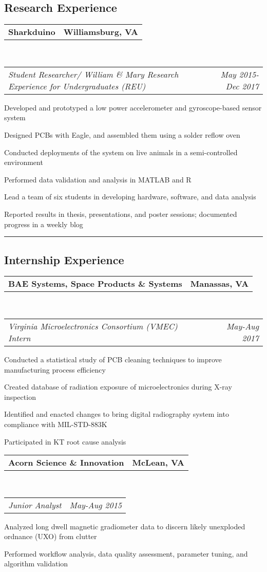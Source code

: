 \documentclass[10pt,letterpaper]{article}
\makeatletter
\newcommand{\headerrow}[2]
{\begin{tabular*}{\linewidth}{l@{\extracolsep{\fill}}r}
	#1 &
	#2 \\
\end{tabular*}}
\makeatother
\begin{document}
\subsection*{Research Experience}

	\headerrow
		{\textbf{Sharkduino}}
		{\textbf{Williamsburg, VA}}
	\\
	\headerrow
		{\emph{Student Researcher/ William \& Mary Research Experience for Undergraduates (REU)}}
		{\emph{May 2015-Dec 2017}}
	\begin{itemize*}
	\item Developed and prototyped a low power accelerometer and gyroscope-based sensor system
	\item Designed PCBs with Eagle, and assembled them using a solder reflow oven
	\item Conducted deployments of the system on live animals in a semi-controlled environment
	\item Performed data validation and analysis in MATLAB and R
	\item Lead a team of six students in developing hardware, software, and data analysis
	\item Reported results in thesis, presentations, and poster sessions; documented progress in a weekly blog
	\end{itemize*}
	
\hrule
\vspace{-0.4em}
\subsection*{Internship Experience}
\headerrow
		{\textbf{BAE Systems, Space Products \& Systems}}
		{\textbf{Manassas, VA}}
	\\
	\headerrow
		{\emph{Virginia Microelectronics Consortium (VMEC) Intern}}
		{\emph{May-Aug 2017}}
\begin{itemize*}
		\item Conducted a statistical study of PCB cleaning techniques to improve manufacturing process efficiency
		\item Created database of radiation exposure of microelectronics during X-ray inspection
		\item Identified and enacted changes to bring digital radiography system into compliance with MIL-STD-883K
		\item Participated in KT root cause analysis
	\end{itemize*}
	\headerrow
		{\textbf{Acorn Science \& Innovation}}
		{\textbf{McLean, VA}}
	\\
	\headerrow
		{\emph{Junior Analyst}}
		{\emph{May-Aug 2015}}
	\begin{itemize*}
		\item Analyzed long dwell magnetic gradiometer data to
			discern likely unexploded ordnance (UXO) from clutter
		\item Performed workflow analysis, data quality assessment, parameter tuning, and algorithm validation
	\end{itemize*}
	
\end{document}
